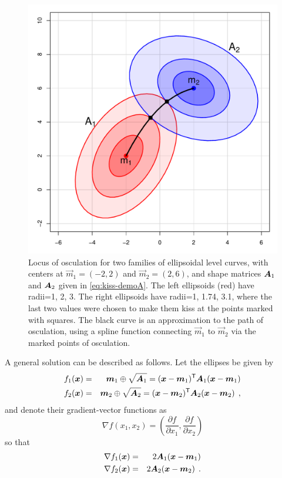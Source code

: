 \begin{figure}[htb!]
  \centering
  \includegraphics[width=.6\textwidth,clip]{fig/kiss-demo}
  \caption{Locus of osculation for two families of ellipsoidal level curves, with centers at $\vec{m}_1 = (-2, 2)$ and  $\vec{m}_2 = (2, 6)$,
  and shape matrices $\bm{A}_1$ and $\bm{A}_2$ given in \eqref{eq:kiss-demoA}.
  The left ellipsoids (red) have radii=1, 2, 3. The right ellipsoids
  have radii=1, 1.74, 3.1, where the last two values were chosen to make them kiss at the points marked with squares. The black curve is an
  approximation to the path of osculation, using a
  spline function connecting $\vec{m}_1$ to $\vec{m}_2$ via the marked points of osculation.}%
  \label{fig:kiss-demo}
\end{figure}

A general solution can be described as follows.  Let the ellipses be given by
\begin{eqnarray*}
f_1(\bm{x}) & = & \bm{m}_1 \oplus \sqrt{\bm{A}_1} = (\bm{x}-\bm{m}_1)^\mathsf{T} \bm{A}_1 (\bm{x}-\bm{m}_1) \\
f_2(\bm{x}) & = & \bm{m}_2 \oplus \sqrt{\bm{A}_2} = (\bm{x}-\bm{m}_2)^\mathsf{T} \bm{A}_2 (\bm{x}-\bm{m}_2) \:\: , \\
\end{eqnarray*}
and denote their gradient-vector functions as
\begin{equation}
\nabla f(x_1, x_2) = \left(\frac{\partial f}{\partial x_1}, \frac{\partial f}{\partial x_2} \right)
\end{equation}
so that
\begin{eqnarray*}
\nabla f_1(\bm{x}) & = & 2 \bm{A}_1 (\bm{x}-\bm{m}_1) \\
\nabla f_2(\bm{x}) & = & 2 \bm{A}_2 (\bm{x}-\bm{m}_2) \:\: . \\
\end{eqnarray*}

